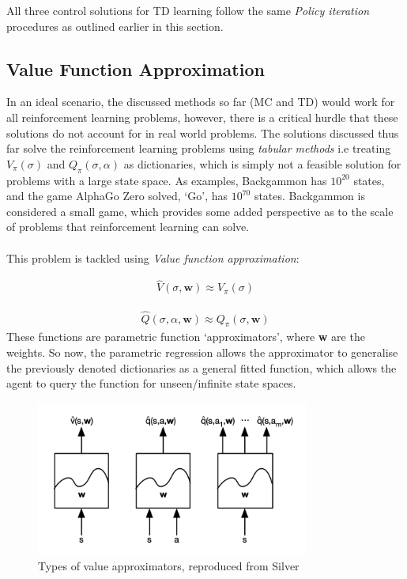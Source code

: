 \documentclass[ %
                    author={Ashwinder Khurana},
                supervisor={Prof Dave Cliff},
                    degree={MEng},
                     title={The Deeply Reinforced Trader},
                  subtitle={},
                      type={enterprise},
                      year={2020} ]{dissertation}
\begin{document}
{\noindent
All three control solutions for TD learning follow the same \textit{Policy iteration} procedures as outlined earlier in this section. 

\subsection{Value Function Approximation}
\label{subsection:value-function-approx}
In an ideal scenario, the discussed methods so far (MC and TD) would work for all reinforcement learning problems, however, there is a critical hurdle that these solutions do not account for in real world problems. The solutions discussed thus far solve the reinforcement learning problems using \textit{tabular methods} i.e treating $V_\pi(\sigma)$ and $Q_\pi(\sigma, \alpha)$ as dictionaries, which is simply not a feasible solution for problems with a large state space. As examples, Backgammon has $10^{20}$ states, and the game AlphaGo Zero solved, \enquote*{Go}, has $10^{70}$ states. Backgammon is considered a small game, which provides some added perspective as to the scale of problems that reinforcement learning can solve. 
\\
\\
\noindent
This problem is tackled using \textit{Value function approximation}:

\begin{equation}
\label{value-approx}
\begin{split}
\hat{V}(\sigma, \textbf{w}) \approx V_\pi(\sigma)
\end{split}
\end{equation}

\begin{equation}
\label{action-value-approx}
\begin{split}
\hat{Q}(\sigma,\alpha, \textbf{w}) \approx Q_\pi(\sigma, \textbf{w})
\end{split}
\end{equation}
\noindent
These functions are parametric function \enquote*{approximators}, where \textbf{w} are the weights. So now, the parametric regression allows the approximator to generalise the previously denoted dictionaries as a general fitted function, which allows the agent to query the function for unseen/infinite state spaces. 


\begin{figure}[H]
  
	\centering
  	\includegraphics[width=0.8\textwidth]{value-approximators.png}
  	\caption{Types of value approximators, reproduced from Silver \cite{VA-fig}}
	 \label{fig:Approximators}


\end{figure}}
\end{document}
